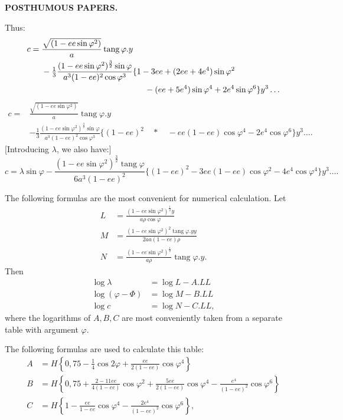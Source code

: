 \par\clearpage
{}\hfill{\small\textbf{POSTHUMOUS PAPERS.}}\hfill\null\par\medskip
Thus:
\[
\begin{aligned}
c={}&\frac{\sqrt{(1-ee\sin\varphi^2)}}a\operatorname{tang}\varphi.y\\
&-\tfrac13\frac{(1-ee\sin\varphi^2)^{\frac32}\sin\varphi}{a^3(1-ee)^2\cos\varphi^3}\{1-3ee+(2ee+4e^4)\sin\varphi^2\\
&\hspace{44mm}-(ee+5e^4)\sin\varphi^4+2e^4\sin\varphi^6\}y^3\ldots
\end{aligned}
\]
\noindent[or]
\[
\begin{aligned}
c={}&\frac{\sqrt{(1-ee\sin\varphi^2)}}a\operatorname{tang}\varphi.y\\
&-\tfrac13\frac{(1-ee\sin\varphi^2)^{\frac32}\sin\varphi}{a^3(1-ee)^2\cos\varphi^3}\{(1-ee)^2\quad *\quad-ee(1-ee)\cos\varphi^4-2e^4\cos\varphi^6\}y^3\ldots.
\end{aligned}
\]
[Introducing \(\lambda\), we also have:]
\[c=\lambda\sin\varphi-\frac{(1-ee\sin\varphi^2)^{\frac32}\operatorname{tang}\varphi}{6a^3(1-ee)^2}\{(1-ee)^2-3ee(1-ee)\cos\varphi^2-4e^4\cos\varphi^4\}y^3\ldots.\]
\medskip
{\centering [3.]\par}
The following formulas are the most convenient for numerical calculation. Let
\[
\begin{aligned}
L&=\frac{(1-ee\sin\varphi^2)^{\frac12}y}{a\rho\cos\varphi}\\
M&=\frac{(1-ee\sin\varphi^2)^2\operatorname{tang}\varphi.yy}{2aa(1-ee)\rho}\\
N&=\frac{(1-ee\sin\varphi^2)^{\frac12}}{a\rho}\operatorname{tang}\varphi.y.
\end{aligned}
\]
Then
\[
\begin{aligned}
\log\lambda&=\log L-A.LL\\
\log(\varphi-\Phi)&=\log M-B.LL\\
\log c&=\log N-C.LL,
\end{aligned}
\]
\noindent where the logarithms of \(A,B,C\) are most conveniently taken from a separate table with argument \(\varphi\).

The following formulas are used to calculate this table:
\[
\begin{aligned}
A&=H\left\{0{,}75-\tfrac14\cos2\varphi+\frac{ee}{2(1-ee)}\cos\varphi^4\right\}\\
B&=H\left\{0{,}75+\frac{2-11ee}{4(1-ee)}\cos\varphi^2+\frac{5ee}{2(1-ee)}\cos\varphi^4-\frac{e^4}{(1-ee)^2}\cos\varphi^6\right\}\\
C&=H\left\{1-\frac{ee}{1-ee}\cos\varphi^4-\frac{2e^4}{(1-ee)^2}\cos\varphi^6\right\},
\end{aligned}
\]

